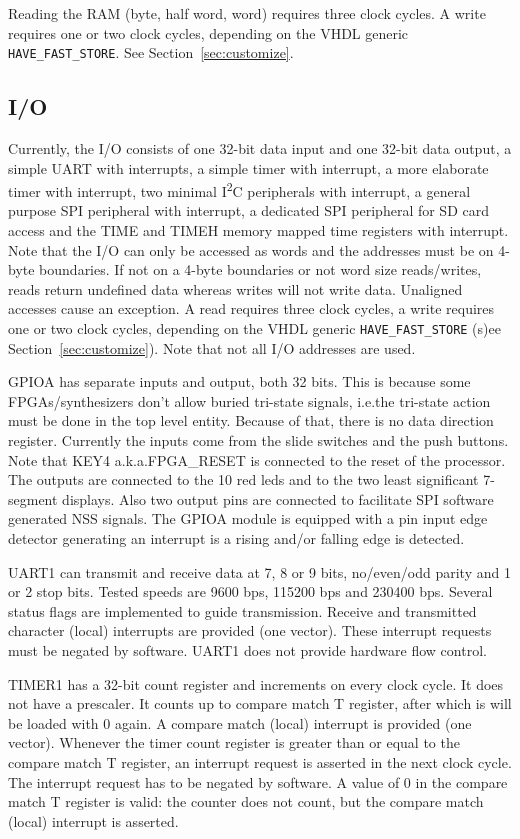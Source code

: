 \documentclass[12pt]{article}
\begin{document}
Reading the RAM (byte, half word, word) requires three clock cycles. A write requires one or two clock cycles, depending on the VHDL generic \lstinline|HAVE_FAST_STORE|. See Section~\ref{sec:customize}.

\subsection{I/O}
\label{sec/io}
Currently, the I/O consists of one 32-bit data input and one 32-bit data output, a simple UART with interrupts, a simple timer with interrupt, a more elaborate timer with interrupt, two minimal I\textsuperscript{2}C peripherals with interrupt, a general purpose SPI peripheral with interrupt, a dedicated SPI peripheral for SD card access and the TIME and TIMEH memory mapped time registers with interrupt. Note that the I/O can only be accessed as words and the addresses must be on 4-byte boundaries. If not on a 4-byte boundaries or not word size reads/writes, reads return undefined data whereas writes will not write data. Unaligned accesses cause an exception. A read requires three clock cycles, a write requires one or two clock cycles, depending on the VHDL generic \lstinline|HAVE_FAST_STORE| (s)ee Section~\ref{sec:customize}). Note that not all I/O addresses are used.

GPIOA has separate inputs and output, both 32 bits. This is because some FPGAs/synthesizers don't allow buried tri-state signals, i.e.\@ the tri-state action must be done in the top level entity. Because of that, there is no data direction register. Currently the inputs come from the slide switches and the push buttons. Note that KEY4 a.k.a.\@ FPGA\_RESET is connected to the reset of the processor. The outputs are connected to the 10 red leds and to the two least significant 7-segment displays. Also two output pins are connected to facilitate SPI software generated NSS signals. The GPIOA module is equipped with a pin input edge detector generating an interrupt is a rising and/or falling edge is detected.

UART1 can transmit and receive data at 7, 8 or 9 bits, no/even/odd parity and 1 or 2 stop bits. Tested speeds are 9600 bps, 115200 bps and 230400 bps. Several status flags are implemented to guide transmission. Receive and transmitted character (local) interrupts are provided (one vector). These interrupt requests must be negated by software. UART1 does not provide hardware flow control.

TIMER1 has a 32-bit count register and increments on every clock cycle. It does not have a prescaler. It counts up to compare match T register, after which is will be loaded with 0 again. A compare match (local) interrupt is provided (one vector). Whenever the timer count register is greater than or equal to the compare match T register, an interrupt request is asserted in the next clock cycle. The interrupt request has to be negated by software. A value of 0 in the compare match T register is valid: the counter does not count, but the compare match (local) interrupt is asserted.
\end{document}
